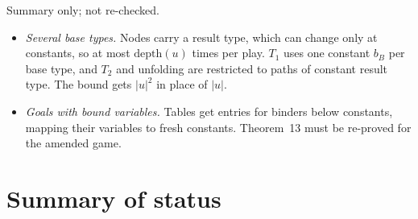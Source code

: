 \documentclass[11pt]{article}
\newcommand{\depth}{\mathrm{depth}}
\theoremstyle{plain}
\theoremstyle{definition}
\theoremstyle{remark}
\begin{document}
Summary only; not re-checked.
\begin{itemize}
\item \emph{Several base types.} Nodes carry a result type, which can
  change only at constants, so at most $\depth(u)$ times per play.
  $T_1$ uses one constant $b_B$ per base type, and $T_2$ and unfolding
  are restricted to paths of constant result type.  The bound gets
  $|u|^2$ in place of $|u|$.
\item \emph{Goals with bound variables.} Tables get entries for binders
  below constants, mapping their variables to fresh constants.  Theorem~13
  must be re-proved for the amended game.
\end{itemize}

\section{Summary of status}\label{sec:summary}
\end{document}
